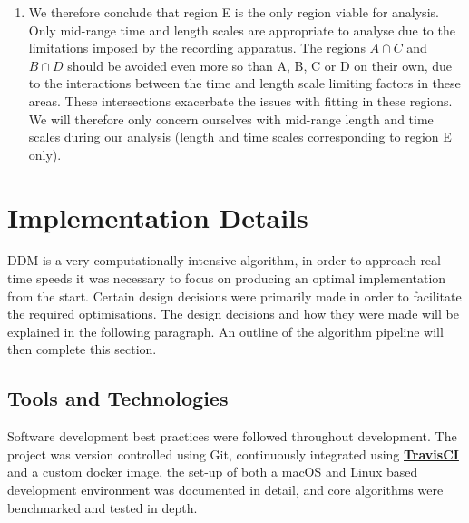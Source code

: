 \documentclass[11pt]{article}
\let\oldhref\href
\renewcommand{\href}[2]{\oldhref{#1}{\bfseries#2}}
\begin{document}
\begin{enumerate}[label=(\Alph*)]
\item We therefore conclude that region E is the only region viable for analysis. Only mid-range time and length scales are appropriate to analyse due to the limitations imposed by the recording apparatus. The regions $A \cap C$ and $B \cap D$ should be avoided even more so than A, B, C or D on their own, due to the interactions between the time and length scale limiting factors in these areas. These intersections exacerbate the issues with fitting in these regions. We will therefore only concern ourselves with mid-range length and time scales during our analysis (length and time scales corresponding to region E only).
\end{enumerate}

\section{Implementation Details}

DDM is a very computationally intensive algorithm, in order to approach real-time speeds it was necessary to focus on producing an optimal implementation from the start. Certain design decisions were primarily made in order to facilitate the required optimisations. The design decisions and how they were made will be explained in the following paragraph. An outline of the algorithm pipeline will then complete this section.

\subsection{Tools and Technologies}
Software development best practices were followed throughout development. The project was version controlled using Git, continuously integrated using \href{https://travis-ci.com}{TravisCI} and a custom docker image, the set-up of both a macOS and Linux based development environment was documented in detail, and core algorithms were benchmarked and tested in depth.
\end{document}
